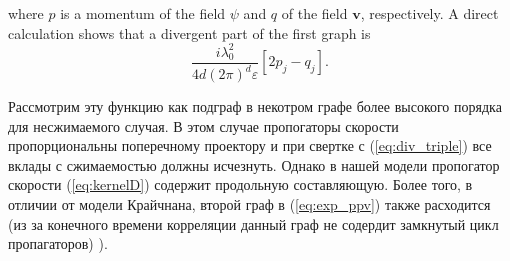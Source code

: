 \documentclass[12pt]{article}
\def\eps{\varepsilon}
\def\mv{{\bm v}}
\begin{document}
where $p$ is a momentum of the field $\psi$ and $q$ of the field $\mv$, respectively.
 A direct calculation shows that a divergent part of the first graph is
\begin{equation}
   \frac{i\lambda_0^2}{4d(2\pi)^d\eps}[2p_j-q_j].
   \label{eq:div_triple}
\end{equation}

Рассмотрим эту функцию как подграф в некотром графе более высокого порядка для несжимаемого случая.
В этом случае пропогаторы скорости пропорциональны поперечному проектору и при свертке с (\ref{eq:div_triple}) все вклады с сжимаемостью должны исчезнуть.
Однако в нашей модели пропогатор скорости (\ref{eq:kernelD}) содержит продольную составляющую.
Более того, в отличии от модели Крайчнана, второй граф в (\ref{eq:exp_ppv}) также расходится (из за конечного времени корреляции данный граф не содердит замкнутый цикл пропагаторов) \cite{Vasiliev,Tauber2014}).
\end{document}
